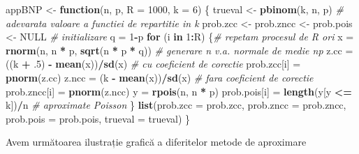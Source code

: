 \documentclass[]{article}
\newenvironment{Shaded}{\begin{snugshade}}{\end{snugshade}}
\newcommand{\KeywordTok}[1]{\textcolor[rgb]{0.13,0.29,0.53}{\textbf{#1}}}
\newcommand{\DataTypeTok}[1]{\textcolor[rgb]{0.13,0.29,0.53}{#1}}
\newcommand{\DecValTok}[1]{\textcolor[rgb]{0.00,0.00,0.81}{#1}}
\newcommand{\StringTok}[1]{\textcolor[rgb]{0.31,0.60,0.02}{#1}}
\newcommand{\CommentTok}[1]{\textcolor[rgb]{0.56,0.35,0.01}{\textit{#1}}}
\newcommand{\OtherTok}[1]{\textcolor[rgb]{0.56,0.35,0.01}{#1}}
\newcommand{\ControlFlowTok}[1]{\textcolor[rgb]{0.13,0.29,0.53}{\textbf{#1}}}
\newcommand{\OperatorTok}[1]{\textcolor[rgb]{0.81,0.36,0.00}{\textbf{#1}}}
\newcommand{\NormalTok}[1]{#1}
\begin{document}
\begin{Shaded}
\begin{Highlighting}[]
\NormalTok{appBNP <-}\StringTok{ }\ControlFlowTok{function}\NormalTok{(n, p, }\DataTypeTok{R =} \DecValTok{1000}\NormalTok{, }\DataTypeTok{k =} \DecValTok{6}\NormalTok{) \{}
\NormalTok{  trueval <-}\StringTok{ }\KeywordTok{pbinom}\NormalTok{(k, n, p) }\CommentTok{# adevarata valoare a functiei de repartitie in k}
\NormalTok{  prob.zcc <-}\StringTok{ }\NormalTok{prob.zncc <-}\StringTok{ }\NormalTok{prob.pois <-}\StringTok{ }\OtherTok{NULL}  \CommentTok{# initializare}
\NormalTok{  q =}\StringTok{ }\DecValTok{1}\OperatorTok{-}\NormalTok{p}
  \ControlFlowTok{for}\NormalTok{ (i }\ControlFlowTok{in} \DecValTok{1}\OperatorTok{:}\NormalTok{R) \{}\CommentTok{# repetam procesul de R ori }
\NormalTok{    x =}\StringTok{ }\KeywordTok{rnorm}\NormalTok{(n, n }\OperatorTok{*}\StringTok{ }\NormalTok{p, }\KeywordTok{sqrt}\NormalTok{(n }\OperatorTok{*}\StringTok{ }\NormalTok{p }\OperatorTok{*}\StringTok{ }\NormalTok{q)) }\CommentTok{# generare n v.a. normale de medie np }
\NormalTok{    z.cc =}\StringTok{ }\NormalTok{((k }\OperatorTok{+}\StringTok{ }\NormalTok{.}\DecValTok{5}\NormalTok{) }\OperatorTok{-}\StringTok{ }\KeywordTok{mean}\NormalTok{(x))}\OperatorTok{/}\KeywordTok{sd}\NormalTok{(x) }\CommentTok{# cu coeficient de corectie}
\NormalTok{    prob.zcc[i] =}\StringTok{ }\KeywordTok{pnorm}\NormalTok{(z.cc)}
\NormalTok{    z.ncc =}\StringTok{ }\NormalTok{(k }\OperatorTok{-}\StringTok{ }\KeywordTok{mean}\NormalTok{(x))}\OperatorTok{/}\KeywordTok{sd}\NormalTok{(x) }\CommentTok{# fara coeficient de corectie}
\NormalTok{    prob.zncc[i] =}\StringTok{ }\KeywordTok{pnorm}\NormalTok{(z.ncc)    }
\NormalTok{    y =}\StringTok{ }\KeywordTok{rpois}\NormalTok{(n, n }\OperatorTok{*}\StringTok{ }\NormalTok{p)}
\NormalTok{    prob.pois[i] =}\StringTok{ }\KeywordTok{length}\NormalTok{(y[y }\OperatorTok{<=}\StringTok{ }\NormalTok{k])}\OperatorTok{/}\NormalTok{n }\CommentTok{# aproximate Poisson}
\NormalTok{  \}}
  \KeywordTok{list}\NormalTok{(}\DataTypeTok{prob.zcc =}\NormalTok{ prob.zcc, }\DataTypeTok{prob.zncc =}\NormalTok{ prob.zncc, }
       \DataTypeTok{prob.pois =}\NormalTok{ prob.pois, }\DataTypeTok{trueval =}\NormalTok{ trueval)}
\NormalTok{\}}
\end{Highlighting}
\end{Shaded}

Avem următoarea ilustrație grafică a diferitelor metode de aproximare
\end{document}
